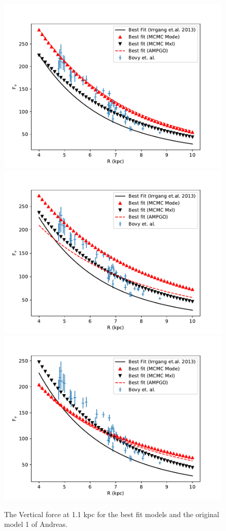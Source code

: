 \documentclass[fleqn,usenatbib]{mnras}
\begin{document}
\begin{figure}
\includegraphics[width=\columnwidth]{Model_III/Plots/Sofue(2009)/VertForce_ModelIII_10000_100.pdf}
\includegraphics[width=\columnwidth]{Model_III/Plots/Sofue(2021)/VertForce_ModelIII_10000_100.pdf}
\includegraphics[width=\columnwidth]{Model_III/Plots/Reid(2014)/VertForce_ModelIII_10000_100.pdf}
\caption{The Vertical force at 1.1 kpc for the best fit models and the original model 1 of Andreas.
}
\label{fig:Model3_vertif}
\end{figure}
\end{document}
